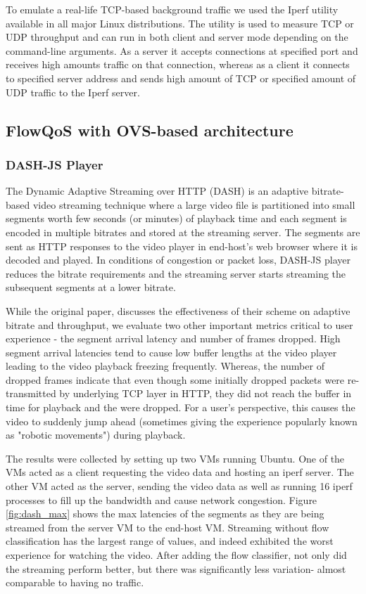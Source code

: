 To emulate a real-life TCP-based background traffic we used the Iperf utility ~\cite{iperf} available in all major Linux distributions. The utility is used to measure TCP or UDP throughput and can run in both client and server mode depending on the command-line arguments. As a server it accepts connections at specified port and receives high amounts traffic on that connection, whereas as a client it connects to specified server address and sends high amount of TCP or specified amount of UDP traffic to the Iperf server.

\subsection{FlowQoS with OVS-based architecture}

\subsubsection{DASH-JS Player}
\label{sec:evaluation:dash-js-player}
The Dynamic Adaptive Streaming over HTTP (DASH) \cite{Dash} is an adaptive bitrate-based video streaming technique where a large video file is partitioned into small segments worth few seconds (or minutes) of playback time and each segment is encoded in multiple bitrates and stored at the streaming server. The segments are sent as HTTP responses to the video player in end-host's web browser where it is decoded and played. In conditions of congestion or packet loss, DASH-JS player \cite{Dash} reduces the bitrate requirements and the streaming server starts streaming the subsequent segments at a lower bitrate.

While the original paper, discusses the effectiveness of their scheme on adaptive bitrate and throughput, we evaluate two other important metrics critical to user experience - the segment arrival latency and number of frames
dropped. High segment arrival latencies tend to cause low buffer lengths at the video player leading to the video playback freezing frequently. Whereas, the number of dropped frames indicate that even though some initially dropped packets were re-transmitted by underlying TCP layer in HTTP, they did not reach the buffer in time for playback and the were dropped. For a user's perspective, this causes the video to suddenly jump ahead (sometimes giving the experience popularly known as "robotic movements") during playback.

The results were collected by setting up two VMs running Ubuntu.  One of the VMs acted as a client requesting the video data and hosting an iperf server.  The other VM acted as the server, sending the video data as well as running 16 iperf processes to fill up the bandwidth and cause network congestion.
Figure \ref{fig:dash_max} shows the max latencies of the segments as they are being streamed from the server VM to the end-host VM.  Streaming without flow classification has the largest range of values, and indeed exhibited the worst experience for watching the video.  After adding the flow classifier, not only did the streaming perform better, but there was significantly less variation- almost comparable to having no traffic.

